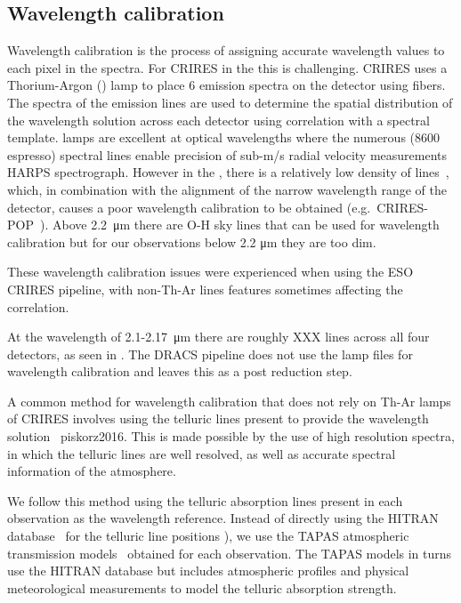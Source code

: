 \subsection{Wavelength calibration}
\label{subsec:wavecalib}
Wavelength calibration is the process of assigning accurate wavelength values to each pixel in the spectra. For CRIRES in the {\nir} this is challenging. CRIRES uses a Thorium-Argon (\thar) lamp to place 6 emission spectra on the detector using fibers. The spectra of the {\thar} emission lines are used to determine the spatial distribution of the wavelength solution across each detector using correlation with a spectral template.  lamps are excellent at optical wavelengths where the numerous (8600 espresso) spectral lines enable precision of sub-m/s radial velocity measurements HARPS spectrograph. However in the {\nir}, there is a relatively low density of {\thar} lines~\citep{kerber_laboratory_2009}, which, in combination with the alignment of the narrow wavelength range of the detector, causes a poor wavelength calibration to be obtained (e.g.\ CRIRES-POP~\citep{nicholls_crirespop_2017}).
Above 2.2~\si{\micro\meter} there are {O-H} sky lines that can be used for wavelength calibration but for our observations below 2.2 \si{\micro\meter} they are too dim.

These wavelength calibration issues were experienced when using the ESO CRIRES pipeline, with non-Th-Ar lines features sometimes affecting the correlation.

At the wavelength of 2.1-2.17~\si{\micro\meter} there are roughly XXX {\thar} lines across all four detectors, as seen in .
The DRACS pipeline does not use the {\thar} lamp files for wavelength calibration and leaves this as a post reduction step.

A common method for wavelength calibration that does not rely on Th-Ar lamps of CRIRES involves using the telluric lines present to provide the wavelength solution ~\citep[e.g.][]{brogi_signature_2012,brogi_carbon_2014,dekok_detection_2013}{\red piskorz2016}. This is made possible by the use of high resolution spectra, in which the telluric lines are well resolved, as well as accurate spectral information of the atmosphere. 

We follow this method using the telluric absorption lines present in each observation as the wavelength reference. Instead of directly using the HITRAN database~\citep{rothman_hitran2012_2013} for the telluric line positions \citet[such as in ][]{brogi_signature_2012,brogi_carbon_2014,dekok_detection_2013}), we use the TAPAS atmospheric transmission models~\citep{bertaux_tapas_2014} obtained for each observation. The TAPAS models in turns use the HITRAN database but includes atmospheric profiles and physical meteorological measurements to model the telluric absorption strength.

